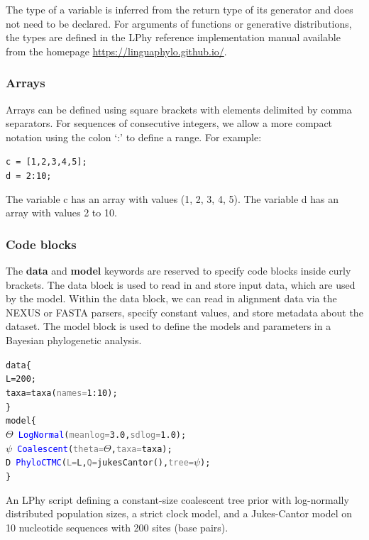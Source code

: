 \documentclass[10pt,letterpaper,table]{article}
\theoremstyle{definition}
\begin{document}
The type of a variable is inferred from the return type of its generator and does not need to be declared. 
For arguments of functions or generative distributions, the types are defined in the LPhy reference implementation manual available from the homepage \url{https://linguaphylo.github.io/}. 

\subsubsection{Arrays}
Arrays can be defined using square brackets with elements delimited by comma separators. 
For sequences of consecutive integers, we allow a more compact notation using the colon `:' to define a range.
For example:  
{
  \small
  \begin{listing}
    \begin{alltt}
    c\, = \,[\textcolor{constant}{1}, \textcolor{constant}{2}, \textcolor{constant}{3}, \textcolor{constant}{4}, \textcolor{constant}{5}];
    d\, = \,\textcolor{constant}{2}:\textcolor{constant}{10};
    \end{alltt}
  \end{listing}
}
\noindent The variable c has an array with values (1, 2, 3, 4, 5). 
The variable d has an array with values 2 to 10.

\subsubsection{Code blocks}
The \textbf{data} and \textbf{model} keywords are reserved to specify code blocks inside curly brackets. 
The data block is used to read in and store input data, which are used by the model. 
Within the data block, we can read in alignment data via the NEXUS or FASTA parsers, specify constant values, and store metadata about the dataset.
The model block is used to define the models and parameters in a Bayesian phylogenetic analysis. 
\begin{example}
{
  \small
    \begin{alltt}
  data \{
    L = \textcolor{constant}{200};
    taxa = \textcolor{generator}{taxa}(\textcolor{gray}{names=}\textcolor{constant}{1}:\textcolor{constant}{10});
  \}
  model \{
    \textcolor{bluishgreen}{\(\Theta\)} ~ \textcolor{blue}{LogNormal}(\textcolor{gray}{meanlog=}\textcolor{constant}{3.0}, \textcolor{gray}{sdlog=}\textcolor{constant}{1.0});
    \textcolor{bluishgreen}{\(\psi\)} ~ \textcolor{blue}{Coalescent}(\textcolor{gray}{theta=}\textcolor{bluishgreen}{\(\Theta\)}, \textcolor{gray}{taxa=}taxa);
    \textcolor{bluishgreen}{D} ~ \textcolor{blue}{PhyloCTMC}(\textcolor{gray}{L=}L, \textcolor{gray}{Q=}\textcolor{generator}{jukesCantor}(), \textcolor{gray}{tree=}\textcolor{bluishgreen}{\(\psi\)});
  \}
    \end{alltt}
    \caption{\small{An LPhy script defining a constant-size coalescent tree prior with log-normally distributed population sizes, a strict clock model, and a Jukes-Cantor model on 10 nucleotide sequences with 200 sites (base pairs).}}
    \label{lphy:jccoal}
}
\end{example}
\end{document}
